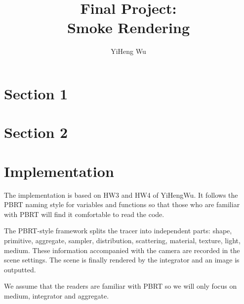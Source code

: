 \documentclass[acmtog]{acmart}
\title{Final Project:\\ {Smoke Rendering}}
\author{ YiHeng Wu }
\begin{document}
\maketitle

\vspace*{2 ex}

\section{Section 1}

\section{Section 2}

\section{Implementation}
    The implementation is based on HW3 and HW4 of YiHengWu.
    It follows the PBRT naming style for variables and functions so that those who are familiar with PBRT will find it comfortable to read the code.\par
        The PBRT-style framework splits the tracer into independent parts: 
    shape, primitive, aggregate, sampler, distribution, scattering, material, texture, light, medium.
    These information accompanied with the camera are recorded in the scene settings.
    The scene is finally rendered by the integrator and an image is outputted.\par
        We assume that the readers are familiar with PBRT so we will only focus on medium, integrator and aggregate.
\end{document}

